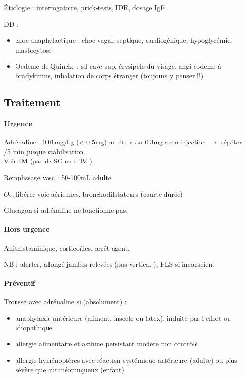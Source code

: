 Étiologie : interrogatoire, {prick-tests, IDR}, dosage IgE

DD : 
\begin{itemize}
\item choc anaphylactique : choc {vagal, septique, cardiogénique}, hypoglycémie, mastocytose
\item Oedeme de Quincke : sd cave sup, érysipèle du visage, angi-eodeme à
  bradykinine, inhalation de corps étranger (toujours y penser !!)
\end{itemize}

\subsection{Traitement}
\paragraph{Urgence}
Adrénaline : 0.01mg/kg (< 0.5mg) adulte à \faHospitalO{} ou  0.3mg
auto-injection $\rightarrow$ répéter /5 min jusque stabilisation\\
Voie IM (pas de SC ou d'IV \danger{})

Remplissage vasc : 50-100mL adulte

$O_2$, libérer voie aériennes, bronchodilatateurs (courte durée)

Glucagon si adrénaline ne fonctionne pas. 

\paragraph{Hors urgence}
Anithistaminique, corticoïdes, arrêt agent.

NB : alerter, allongé jambes relevées (pas vertical \danger{} \skull), PLS si
inconscient

\paragraph{Préventif}
Trousse avec adrénaline si (absolument) :
\begin{itemize}
\item anaphylaxie antérieure (aliment, insecte ou latex), induite par l'effort
  ou idiopathique
\item allergie alimentaire et asthme persistant modéré non contrôlé
\item allergie hyménoptères avec réaction systémique antérieure (adulte) ou
  plus sévère que cutanéomuqueux (enfant)
\end{itemize}

